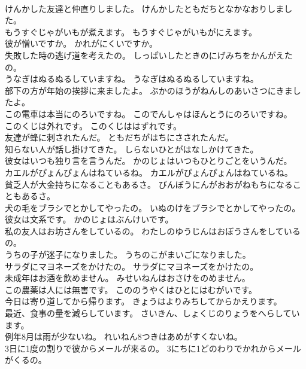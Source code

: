 \documentclass[8pt]{extreport}
\begin{document}
\begin{CJK}{UTF8}{min}
\\	けんかした友達と仲直りしました。	けんかしたともだちとなかなおりしました。 
\\	もうすぐじゃがいもが煮えます。	もうすぐじゃがいもがにえます。 
\\	彼が憎いですか。	かれがにくいですか。 
\\	失敗した時の逃げ道を考えたの。	しっぱいしたときのにげみちをかんがえたの。 
\\	うなぎはぬるぬるしていますね。	うなぎはぬるぬるしていますね。 
\\	部下の方が年始の挨拶に来ましたよ。	ぶかのほうがねんしのあいさつにきましたよ。 
\\	この電車は本当にのろいですね。	このでんしゃはほんとうにのろいですね。 
\\	このくじは外れです。	このくじははずれです。 
\\	友達が蜂に刺されたんだ。	ともだちがはちにさされたんだ。 
\\	知らない人が話し掛けてきた。	しらないひとがはなしかけてきた。 
\\	彼女はいつも独り言を言うんだ。	かのじょはいつもひとりごとをいうんだ。 
\\	カエルがぴょんぴょんはねているね。	カエルがぴょんぴょんはねているね。 
\\	貧乏人が大金持ちになることもあるさ。	びんぼうにんがおおがねもちになることもあるさ。 
\\	犬の毛をブラシでとかしてやったの。	いぬのけをブラシでとかしてやったの。 
\\	彼女は文系です。	かのじょはぶんけいです。 
\\	私の友人はお坊さんをしているの。	わたしのゆうじんはおぼうさんをしているの。 
\\	うちの子が迷子になりました。	うちのこがまいごになりました。 
\\	サラダにマヨネーズをかけたの。	サラダにマヨネーズをかけたの。 
\\	未成年はお酒を飲めません。	みせいねんはおさけをのめません。 
\\	この農薬は人には無害です。	こののうやくはひとにはむがいです。 
\\	今日は寄り道してから帰ります。	きょうはよりみちしてからかえります。 
\\	最近、食事の量を減らしています。	さいきん、しょくじのりょうをへらしています。 
\\	例年8月は雨が少ないね。	れいねん8つきはあめがすくないね。 
\\	3日に1度の割りで彼からメールが来るの。	3にちに1どのわりでかれからメールがくるの。 

\end{CJK}
\end{document}
